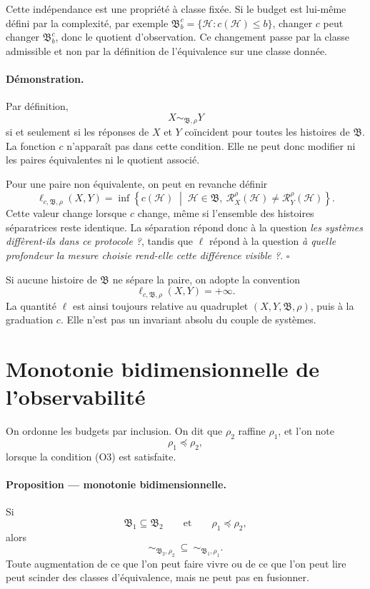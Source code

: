 Cette indépendance est une propriété à classe fixée. Si le budget est
lui-même défini par la complexité, par exemple
\(
\mathfrak B_b^c=\{\mathcal H:c(\mathcal H)\leq b\}
\), changer \(c\) peut changer \(\mathfrak B_b^c\), donc le quotient
d'observation. Ce changement passe par la classe admissible et non par
la définition de l'équivalence sur une classe donnée.

\paragraph{Démonstration.}
Par définition,
\[
X\sim_{\mathfrak B,\rho}Y
\]
si et seulement si les réponses de \(X\) et \(Y\) coïncident pour
toutes les histoires de \(\mathfrak B\). La fonction \(c\) n'apparaît
pas dans cette condition. Elle ne peut donc modifier ni les paires
équivalentes ni le quotient associé.

Pour une paire non équivalente, on peut en revanche définir
\begin{equation}
\label{eq:annexe-G-longueur-separation}
\ell_{c,\mathfrak B,\rho}(X,Y)
=
\inf\left\{
 c(\mathcal H)
 \;\middle|\;
 \mathcal H\in\mathfrak B,
 \ \mathcal R_X^\rho(\mathcal H)
 \neq
 \mathcal R_Y^\rho(\mathcal H)
\right\}.
\end{equation}
Cette valeur change lorsque \(c\) change, même si l'ensemble des
histoires séparatrices reste identique. La séparation répond donc à la
question \emph{les systèmes diffèrent-ils dans ce protocole ?}, tandis
que \(\ell\) répond à la question \emph{à quelle profondeur la mesure
choisie rend-elle cette différence visible ?}.
\hfill\(\square\)

Si aucune histoire de \(\mathfrak B\) ne sépare la paire, on adopte la
convention
\[
\ell_{c,\mathfrak B,\rho}(X,Y)=+\infty.
\]
La quantité \(\ell\) est ainsi toujours relative au quadruplet
\((X,Y,\mathfrak B,\rho)\), puis à la graduation \(c\). Elle n'est pas
un invariant absolu du couple de systèmes.

\section{Monotonie bidimensionnelle de l'observabilité}
\label{annexe-histoires-monotonie}

On ordonne les budgets par inclusion. On dit que \(\rho_2\) raffine
\(\rho_1\), et l'on note
\[
\rho_1\preceq\rho_2,
\]
lorsque la condition (O3) est satisfaite.

\paragraph{Proposition \theproposition{} --- monotonie bidimensionnelle.}
Si
\[
\mathfrak B_1\subseteq\mathfrak B_2
\qquad\text{et}\qquad
\rho_1\preceq\rho_2,
\]
alors
\begin{equation}
\label{eq:annexe-G-monotonie}
\boxed{
\sim_{\mathfrak B_2,\rho_2}
\ \subseteq\ 
\sim_{\mathfrak B_1,\rho_1}.
}
\end{equation}
Toute augmentation de ce que l'on peut faire vivre ou de ce que l'on
peut lire peut scinder des classes d'équivalence, mais ne peut pas en
fusionner.

